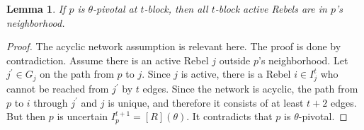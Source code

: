\documentclass[12pt,letter]{article}
\newtheorem{lemma}{Lemma}[section]
\theoremstyle{definition}
\theoremstyle{remark}
\theoremstyle{claim}
\begin{document}
\begin{lemma}%
If $p$ is $\theta$-pivotal at $t$-block, then all $t$-block active Rebels are in $p$'s neighborhood.  
\end{lemma}
\begin{proof}
The acyclic network assumption is relevant here. The proof is done by contradiction. Assume there is an active Rebel $j$ outside $p$'s neighborhood. Let $j^{'}\in G_j$ on the path from $p$ to $j$. Since $j$ is active, there is a Rebel $i\in I^t_j$ who cannot be reached from $j^{'}$ by $t$ edges. Since the network is acyclic, the path from $p$ to $i$ through $j^{'}$ and $j$ is unique, and therefore it consists of at least $t+2$ edges. But then $p$ is uncertain $I^{t+1}_p=[R](\theta)$. It contradicts that $p$ is $\theta$-pivotal.
\end{proof}
\end{document}
